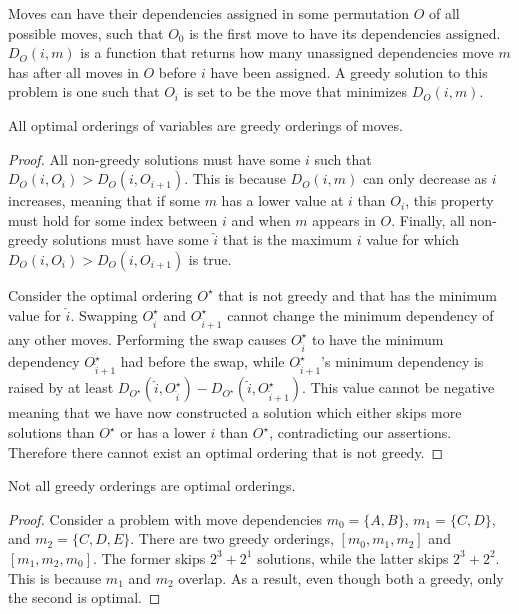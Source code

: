 \documentclass[runningheads,a4paper]{llncs}
\begin{document}
Moves can have their dependencies assigned in some permutation $O$ of all possible moves,
such that $O_0$ is the first move to have its dependencies assigned.
$D_O(i, m)$ is a function that returns how many unassigned dependencies move $m$ has after all
moves in $O$ before $i$ have been assigned. A greedy solution to this problem is one such
that $O_i$ is set to be the move that minimizes $D_O(i, m)$.

\begin{theorem}
All optimal orderings of variables are greedy orderings of moves.
\end{theorem}

\begin{proof}
All non-greedy solutions must have some $i$ such that $D_O(i, O_i) > D_O(i, O_{i+1})$.
This is because $D_O(i, m)$ can only decrease as $i$ increases, meaning that if some $m$
has a lower value at $i$ than $O_i$, this property must hold for
some index between $i$ and when $m$ appears in $O$.
Finally, all non-greedy solutions must have some $\hat{i}$
that is the maximum $i$ value for which $D_O(i, O_i) > D_O(i, O_{i+1})$ is true. 

Consider the optimal ordering $O^\star$ that is not greedy and that has the minimum value for $\hat{i}$.
Swapping $O_{\hat{i}}^\star$ and $O_{\hat{i}+1}^\star$ cannot change the minimum dependency of any other moves.
Performing the swap causes $O_{\hat{i}}^\star$ to have the minimum dependency $O_{\hat{i}+1}^\star$ had before
the swap, while $O_{\hat{i}+1}^\star$'s minimum dependency is raised by at least
$D_{O^\star}(\hat{i}, O_{\hat{i}}^\star) - D_{O^\star}(\hat{i}, O_{\hat{i}+1}^\star)$. This value
cannot be negative meaning that we have now constructed a solution which either skips more
solutions than $O^\star$ or has a lower $\hat{i}$ than $O^\star$, contradicting our assertions.
Therefore there cannot exist an optimal ordering that is not greedy.
\end{proof}


\begin{theorem}
Not all greedy orderings are optimal orderings.
\end{theorem}

\begin{proof}
Consider a problem with move dependencies $m_0 = \{A, B\}$, $m_1 = \{C, D\}$, and $m_2 = \{C, D, E\}$.
There are two greedy orderings, $[m_0, m_1, m_2]$ and $[m_1, m_2, m_0]$. The former
skips $2^3+2^1$ solutions, while the latter skips $2^3+2^2$. This is because $m_1$ and
$m_2$ overlap. As a result, even though both a greedy, only the second is optimal.
\end{proof}
\end{document}
